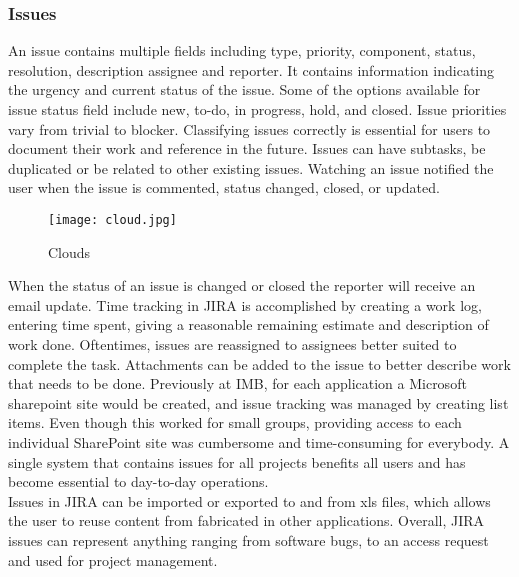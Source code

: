   \subsubsection{Issues}
  An \gls{issue} contains multiple fields including type, priority, component, status, resolution, description assignee and reporter. It contains information indicating the urgency and current status of the issue. Some of the options available for issue status field include new, to-do, in progress, hold, and closed. Issue priorities vary from trivial to blocker. Classifying issues correctly is essential for users to document their work and reference in the future. Issues can have subtasks, be duplicated or be related to other existing issues. Watching an issue notified the user when the issue is commented, status changed, closed, or updated.
  \begin{figure}
  	\texttt{[image: cloud.jpg]}
  	\caption{Clouds}
  \end{figure}
 \noindent When the status of an issue is changed or closed the reporter will receive an email update. Time tracking in \gls{JIRA} is accomplished by creating a work log, entering time spent, giving a reasonable remaining estimate and description of work done. Oftentimes, issues are reassigned to assignees better suited to complete the task. Attachments can be added to the issue to better describe work that needs to be done. Previously at IMB, for each application a Microsoft \gls{sharepoint} site would be created, and issue tracking was managed by creating list items. Even though this worked for small groups, providing access to each individual SharePoint site was cumbersome and time-consuming for everybody. A single system that contains issues for all projects benefits all users and has become essential to day-to-day operations. \\ 
 
 \noindent Issues in JIRA can be imported or exported to and from xls files, which allows the user to reuse content from fabricated in other applications. Overall, JIRA issues can represent anything ranging from software bugs, to an access request and used for project management.
 
